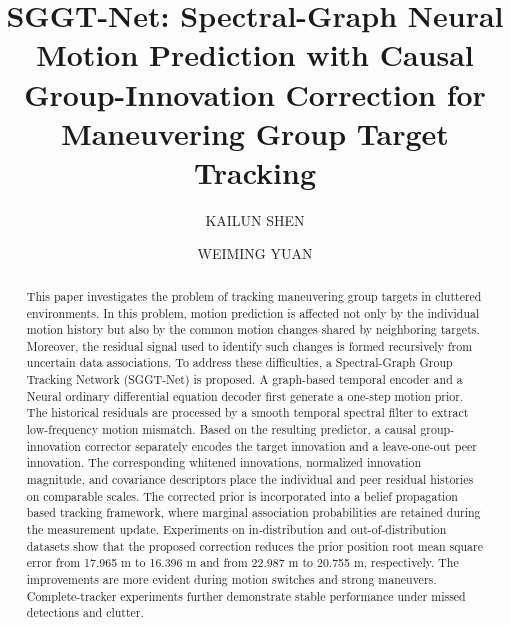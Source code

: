 \documentclass[10pt,doublecolumn]{IEEEtaes}
\begin{document}
\title{SGGT-Net: Spectral-Graph Neural Motion Prediction with Causal Group-Innovation Correction for Maneuvering Group Target Tracking}

\author{KAILUN SHEN}

\author{WEIMING YUAN}


\maketitle

\begin{abstract}
This paper investigates the problem of tracking maneuvering group targets in cluttered environments. In this problem, motion prediction is affected not only by the individual motion history but also by the common motion changes shared by neighboring targets. Moreover, the residual signal used to identify such changes is formed recursively from uncertain data associations. To address these difficulties, a Spectral-Graph Group Tracking Network (SGGT-Net) is proposed. A graph-based temporal encoder and a Neural ordinary differential equation decoder first generate a one-step motion prior. The historical residuals are processed by a smooth temporal spectral filter to extract low-frequency motion mismatch. Based on the resulting predictor, a causal group-innovation corrector separately encodes the target innovation and a leave-one-out peer innovation. The corresponding whitened innovations, normalized innovation magnitude, and covariance descriptors place the individual and peer residual histories on comparable scales. The corrected prior is incorporated into a belief propagation based tracking framework, where marginal association probabilities are retained during the measurement update. Experiments on in-distribution and out-of-distribution datasets show that the proposed correction reduces the prior position root mean square error from 17.965 m to 16.396 m and from 22.987 m to 20.755 m, respectively. The improvements are more evident during motion switches and strong maneuvers. Complete-tracker experiments further demonstrate stable performance under missed detections and clutter.
\end{abstract}
\end{document}
